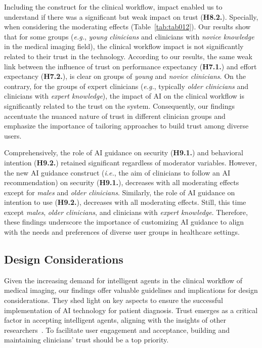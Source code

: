 Including the construct for the clinical workflow, impact enabled us to understand if there was a significant but weak impact on trust ({\bf H8.2.}).
Specially, when considering the moderating effects (Table~\ref{tab:tab012}).
Our results show that for some groups ({\it e.g.}, {\it young clinicians} and clinicians with {\it novice knowledge} in the medical imaging field), the clinical workflow impact is not significantly related to their trust in the technology.
According to our results, the same weak link between the influence of trust on performance expectancy ({\bf H7.1.}) and effort expectancy ({\bf H7.2.}), is clear on groups of {\it young} and {\it novice clinicians}.
On the contrary, for the groups of expert clinicians ({\it e.g.}, typically {\it older clinicians} and clinicians with {\it expert knowledge}), the impact of \ac{AI} on the clinical workflow is significantly related to the trust on the system.
Consequently, our findings accentuate the nuanced nature of trust in different clinician groups and emphasize the importance of tailoring approaches to build trust among diverse users.

Comprehensively, the role of \ac{AI} guidance on security ({\bf H9.1.}) and behavioral intention ({\bf H9.2.}) retained significant regardless of moderator variables.
However, the new \ac{AI} guidance construct ({\it i.e.}, the aim of clinicians to follow an \ac{AI} recommendation) on security ({\bf H9.1.}), decreases with all moderating effects except for {\it males} and {\it older clinicians}.
Similarly, the role of \ac{AI} guidance on intention to use ({\bf H9.2.}), decreases with all moderating effects.
Still, this time except {\it males}, {\it older clinicians}, and clinicians with {\it expert knowledge}.
Therefore, these findings underscore the importance of customizing \ac{AI} guidance to align with the needs and preferences of diverse user groups in healthcare settings.

\subsection{Design Considerations}
\label{chap:app002005002}

Given the increasing demand for intelligent agents in the clinical workflow of medical imaging, our findings offer valuable guidelines and implications for design considerations.
They shed light on key aspects to ensure the successful implementation of \ac{AI} technology for patient diagnosis.
Trust emerges as a critical factor in accepting intelligent agents, aligning with the insights of other researchers~\cite{LIU2022107026}.
To facilitate user engagement and acceptance, building and maintaining clinicians' trust should be a top priority.

